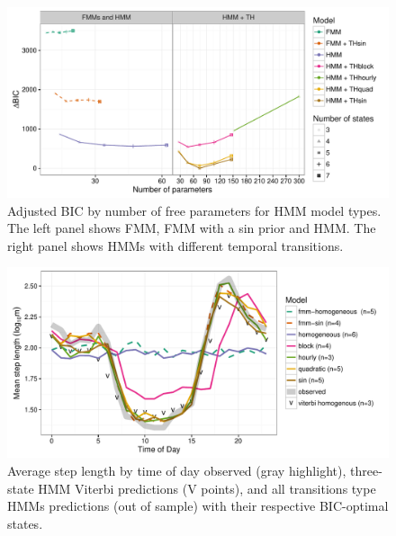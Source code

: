 \documentclass{bmcart}
\begin{document}
\begin{backmatter}
  \begin{figure}[h!]
   \includegraphics[width=5in]{figure/adj_BIC_comparisons-1}
  \caption{ Adjusted BIC by number of free parameters for HMM model types. The left panel shows FMM, FMM with a sin prior and HMM. The right panel shows HMMs with different temporal transitions.}
      \end{figure}
      
\begin{figure}[h!]
   \includegraphics[width=5in]{figure/avg_step_length_by_time-1}
  \caption{ Average step length by time of day observed (gray highlight), three-state HMM Viterbi predictions (V points), and all transitions type HMMs predictions (out of sample) with their respective BIC-optimal states.}
      \end{figure}
      

\end{backmatter}
\end{document}

